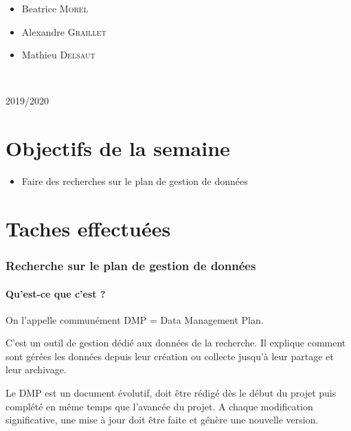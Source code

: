 \documentclass[11pt,oneside]{article}
\begin{document}
\begin{titlepage}
\begin{minipage}{0.45\textwidth}
\begin{flushright}
\begin{itemize}[font=\color{amber} \Large, label=, leftmargin=3.5cm]
\item{Beatrice \textsc{Morel}}
\item{Alexandre \textsc{Graillet}}
\item{Mathieu \textsc{Delsaut}}
\end{itemize}

\end{flushright}
\end{minipage}\\[0cm]
\vspace{10cm} 
\begin{center}
2019/2020
\end{center}
\vfill
\end{titlepage}


\newpage
\part*{Objectifs de la semaine}
\begin{itemize}
	\item Faire des recherches sur le plan de gestion de données
\end{itemize}



\part*{Taches effectuées}
\section*{Recherche sur le plan de gestion de données}
\subsection*{Qu'est-ce que c'est ?}

\begin{flushleft}
On l'appelle communément DMP = Data Management Plan.
\end{flushleft}

\begin{flushleft}
C’est un outil de gestion dédié aux données de la recherche. Il explique comment sont gérées les données depuis leur création ou collecte jusqu’à leur partage et leur archivage.
\end{flushleft}

\begin{flushleft}
Le DMP est un document évolutif, doit être rédigé dès le début du projet puis complété en même temps que l’avancée du projet. A chaque modification significative, une mise à jour doit être faite et génère une nouvelle version.
\end{flushleft}
\end{document}
